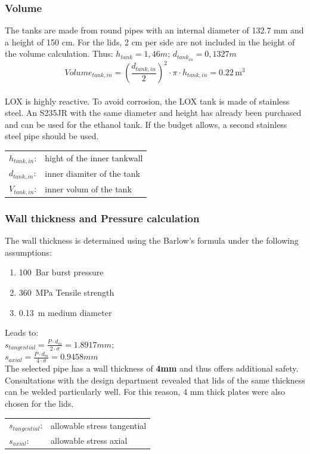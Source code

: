 \subsubsection{Volume}
The tanks are made from round pipes with an internal diameter of 132.7 mm and a height of 150 cm. For the lids, 2 cm per side are not included in the height of the volume calculation. Thus: $h_{tank} = 1,46 m$; $d_{tank_{in}} = 0,1327 m$\\
$$Volume_{tank,in} = \left(\frac{d_{tank,in}}{2}\right)^2 \cdot \pi \cdot h_{tank,in} = 0.22 \, \text{m}^3$$ \\ 

LOX is highly reactive. To avoid corrosion, the LOX tank is made of stainless steel. An S235JR with the same diameter and height has already been purchased and can be used for the ethanol tank. If the budget allows, a second stainless steel pipe should be used.
\newline
\begin{tabular}{ll}
    ${h}_{tank,in}$:    & hight of the inner tankwall \\
    ${d}_{tank,in}$:    & inner diamiter of the tank \\
    ${V}_{tank,in}$:    & inner volum of the tank \\
\end{tabular}
\newline
\subsubsection{Wall thickness and Pressure calculation}
The wall thickness is determined using the Barlow's formula under the following assumptions:
\begin{enumerate}
    \item \qty{100}{Bar} burst pressure
    \item \qty{360}{MPa} Tensile strength
    \item \qty{0.13}{m} medium diameter
\end{enumerate}
Leads to:\\
$s_{tangential} = \frac{P\cdot d_m}{2\cdot\sigma}=1.8917mm;$\\
$s_{axial} = \frac{P\cdot d_m}{4\cdot\sigma}=0.9458mm$\\
The selected pipe has a wall thickness of \textbf{4mm} and thus offers additional safety. Consultations with the design department revealed that lids of the same thickness can be welded particularly well. For this reason, 4 mm thick plates were also chosen for the lids.
\newline
\begin{tabular}{ll}
    ${s}_{tangential}$: & allowable stress tangential \\
    ${s}_{axial}$:      & allowable stress axial \\
\end{tabular}
\newline
